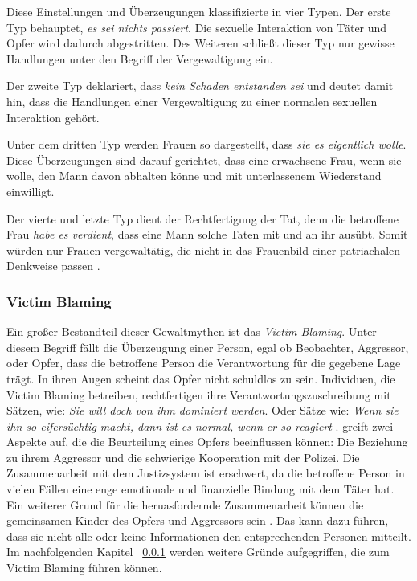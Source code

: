 Diese Einstellungen und Überzeugungen klassifizierte \textcite{Vergewaltigung_Typen_Burt_1991} in vier Typen. Der erste Typ behauptet, \textit{es sei nichts passiert}. Die sexuelle Interaktion von Täter und Opfer wird dadurch abgestritten. Des Weiteren schließt dieser Typ nur gewisse Handlungen unter den Begriff der Vergewaltigung ein. 

Der zweite Typ deklariert, dass \textit{kein Schaden entstanden sei} und deutet damit hin, dass die Handlungen einer Vergewaltigung zu einer normalen sexuellen Interaktion gehört.

Unter dem dritten Typ werden Frauen so dargestellt, dass \textit{sie es eigentlich wolle}. Diese Überzeugungen sind darauf gerichtet, dass eine erwachsene Frau, wenn sie wolle, den Mann davon abhalten könne und mit unterlassenem Wiederstand einwilligt.

Der vierte und letzte Typ dient der Rechtfertigung der Tat, denn die betroffene Frau \textit{habe es verdient}, dass eine Mann solche Taten mit und an ihr ausübt. Somit würden nur Frauen vergewaltätig, die nicht in das Frauenbild einer patriachalen Denkweise passen \parencite{Vergewaltigung_Typen_Burt_1991}.


\subsubsection{Victim Blaming}     \label{2.1.3.2}
Ein großer Bestandteil dieser Gewaltmythen ist das \textit{Victim Blaming}. Unter diesem Begriff fällt die Überzeugung einer Person, egal ob Beobachter, Aggressor, oder Opfer, dass die betroffene Person die Verantwortung für die gegebene Lage trägt. In ihren Augen scheint das Opfer nicht schuldlos zu sein. Individuen, die Victim Blaming betreiben, rechtfertigen ihre Verantwortungszuschreibung mit Sätzen, wie: \textit{Sie will doch von ihm dominiert werden}. Oder Sätze wie: \textit{Wenn sie ihn so eifersüchtig macht, dann ist es normal, wenn er so reagiert} \parencite{Peters2003}. \textcite{victim_blaming} greift zwei Aspekte auf, die die Beurteilung eines Opfers beeinflussen können: Die Beziehung zu ihrem Aggressor und die schwierige Kooperation mit der Polizei. Die Zusammenarbeit mit dem Justizsystem ist erschwert, da die betroffene Person in vielen Fällen eine enge emotionale und finanzielle Bindung mit dem Täter hat. Ein weiterer Grund für die heruasfordernde Zusammenarbeit können die gemeinsamen Kinder des Opfers und Aggressors sein \parencite{victim_blaming}. Das kann dazu führen, dass sie nicht alle oder keine Informationen den entsprechenden Personen mitteilt. Im nachfolgenden Kapitel ~\ref{2.1.3.2} werden weitere Gründe aufgegriffen, die zum Victim Blaming führen können.


